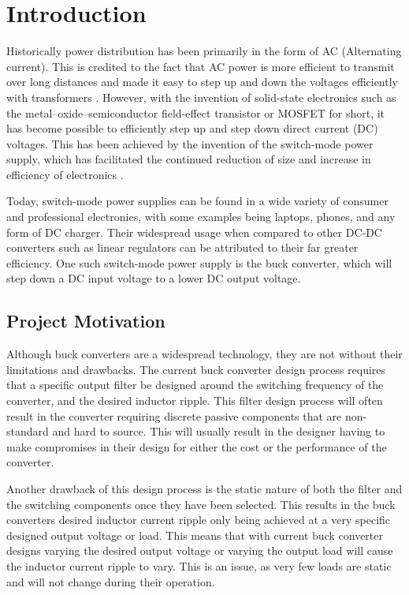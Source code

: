 \chapter{Introduction}\label{C:intro}

Historically power distribution has been primarily in the form of AC (Alternating current). This is credited to the fact that AC power is more efficient to transmit over long distances and made it easy to step up and down the voltages efficiently with transformers \cite{Earley2013}. However, with the invention of solid-state electronics such as the metal–oxide–semiconductor field-effect transistor or MOSFET for short, it has become possible to efficiently step up and step down direct current (DC) voltages. This has been achieved by the invention of the switch-mode power supply, which has facilitated the continued reduction of size and increase in efficiency of electronics \cite{Bocock}.

Today, switch-mode power supplies can be found in a wide variety of consumer and professional electronics, with some examples being laptops, phones, and any form of DC charger. Their widespread usage when compared to other DC-DC converters such as linear regulators can be attributed to their far greater efficiency. One such switch-mode power supply is the buck converter, which will step down a DC input voltage to a lower DC output voltage.

\section{Project Motivation}

Although buck converters are a widespread technology, they are not without their limitations and drawbacks. The current buck converter design process requires that a specific output filter be designed around the switching frequency of the converter, and the desired inductor ripple. This filter design process will often result in the converter requiring discrete passive components that are non-standard and hard to source. This will usually result in the designer having to make compromises in their design for either the cost or the performance of the converter.

Another drawback of this design process is the static nature of both the filter and the switching components once they have been selected. This results in the buck converters desired inductor current ripple only being achieved at a very specific designed output voltage or load. This means that with current buck converter designs varying the desired output voltage or varying the output load will cause the inductor current ripple to vary. This is an issue, as very few loads are static and will not change during their operation. 

